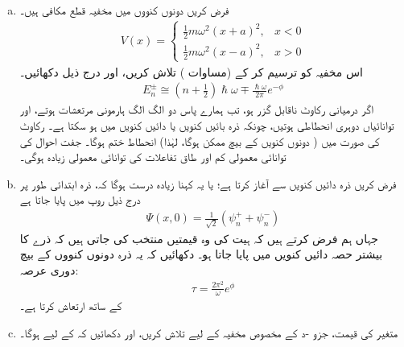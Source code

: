 \begin{enumerate}[a.]
\begin{align}
	\theta\cong\left(n+\frac{1}{2}\right)\pi\mp\frac{1}{2}e^{-\phi}
\end{align}
\item
 فرض کریں دونوں کنووں میں مخفیہ قطع مکافی ہیں۔
\begin{align}
	V(x)=
	\begin{cases}
		\frac{1}{2}m\omega^{2}(x+a)^{2},& x< 0 \\
		\frac{1}{2}m\omega^{2}(x-a)^{2},& x> 0
	\end{cases}
\end{align}
اس مخفیہ کو ترسیم کر کے  (مساوات ) تلاش کریں، اور درج ذیل دکھائیں۔
\begin{align}\label{مساوات_وقب_نتیجہ_قطع_مکافی}
	E^{\pm}_{n}\cong\left(n+\frac{1}{2}\right)\hslash\omega\mp\frac{\hslash\omega}{2\pi} e^{-\phi}
\end{align}
 اگر درمیانی رکاوٹ ناقابل گزر ہو، تب ہمارے پاس دو الگ الگ ہارمونی مرتعشات ہوتے، اور توانائیاں  دوہری انحطاطی ہوتیں، چونکہ ذرہ بائیں کنویں یا دائیں کنویں میں ہو سکتا ہے۔  رکاوٹ کی صورت میں ( دونوں کنویں کے بیچ  ممکن ہوگا، لہٰذا) انحطاط ختم ہوگا۔ جفت احوال  کی توانائی معمولی کم اور طاق تفاعلات  کی توانائی معمولی زیادہ ہوگی۔
\item
 فرض کریں ذرہ دائیں کنویں سے آغاز کرتا ہے؛ یا یہ کہنا زیادہ درست ہوگا کہ، ذرہ ابتدائی طور پر درج ذیل روپ میں پایا جاتا ہے 
\begin{align*}
	\Psi(x,0)=\frac{1}{\sqrt{2}}(\psi^{+}_{n}+\psi^{-}_{n})
\end{align*}
جہاں ہم فرض کرتے ہیں کہ ہیت کی وہ قیمتیں منتخب کی جاتی ہیں کہ ذرے کا بیشتر حصہ دائیں کنویں میں پایا جاتا ہو۔ دکھائیں کہ یہ ذرہ دونوں کنووں کے بیچ دوری عرصہ:
\begin{align}
	\tau=\frac{2\pi^{2}}{\omega} e^{\phi}
\end{align}
کے ساتھ ارتعاش کرتا ہے۔
\item
 متغیر  کی قیمت، جزو -د کے مخصوص مخفیہ کے لیے تلاش کریں، اور دکھائیں کہ کے لیے  ہوگا۔
 \end{enumerate}
